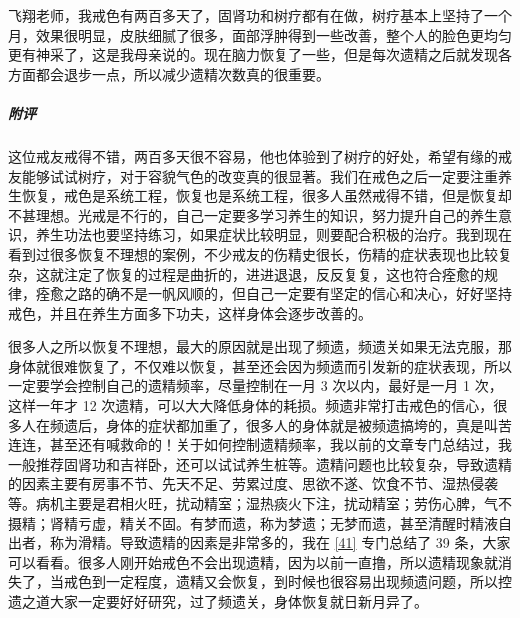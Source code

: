 \begin{case}
    飞翔老师，我戒色有两百多天了，固肾功和树疗都有在做，树疗基本上坚持了一个月，效果很明显，皮肤细腻了很多，面部浮肿得到一些改善，整个人的脸色更均匀更有神采了，这是我母亲说的。现在脑力恢复了一些，但是每次遗精之后就发现各方面都会退步一点，所以减少遗精次数真的很重要。
    \subparagraph{附评} 这位戒友戒得不错，两百多天很不容易，他也体验到了树疗的好处，希望有缘的戒友能够试试树疗，对于容貌气色的改变真的很显著。我们在戒色之后一定要注重养生恢复，戒色是系统工程，恢复也是系统工程，很多人虽然戒得不错，但是恢复却不甚理想。光戒是不行的，自己一定要多学习养生的知识，努力提升自己的养生意识，养生功法也要坚持练习，如果症状比较明显，则要配合积极的治疗。我到现在看到过很多恢复不理想的案例，不少戒友的伤精史很长，伤精的症状表现也比较复杂，这就注定了恢复的过程是曲折的，进进退退，反反复复，这也符合痊愈的规律，痊愈之路的确不是一帆风顺的，但自己一定要有坚定的信心和决心，好好坚持戒色，并且在养生方面多下功夫，这样身体会逐步改善的。

    很多人之所以恢复不理想，最大的原因就是出现了频遗，频遗关如果无法克服，那身体就很难恢复了，不仅难以恢复，甚至还会因为频遗而引发新的症状表现，所以一定要学会控制自己的遗精频率，尽量控制在一月 3 次以内，最好是一月 1 次，这样一年才 12 次遗精，可以大大降低身体的耗损。频遗非常打击戒色的信心，很多人在频遗后，身体的症状都加重了，很多人的身体就是被频遗搞垮的，真是叫苦连连，甚至还有喊救命的！关于如何控制遗精频率，我以前的文章专门总结过，我一般推荐固肾功和吉祥卧，还可以试试养生桩等。遗精问题也比较复杂，导致遗精的因素主要有房事不节、先天不足、劳累过度、思欲不遂、饮食不节、湿热侵袭等。病机主要是君相火旺，扰动精室；湿热痰火下注，扰动精室；劳伤心脾，气不摄精；肾精亏虚，精关不固。有梦而遗，称为梦遗；无梦而遗，甚至清醒时精液自出者，称为滑精。导致遗精的因素是非常多的，我在 \ref{41} 专门总结了 39 条，大家可以看看。很多人刚开始戒色不会出现遗精，因为以前一直撸，所以遗精现象就消失了，当戒色到一定程度，遗精又会恢复，到时候也很容易出现频遗问题，所以控遗之道大家一定要好好研究，过了频遗关，身体恢复就日新月异了。
\end{case}

